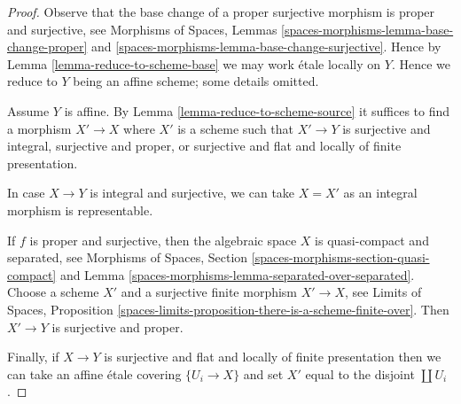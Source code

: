 \documentclass[10pt,a4paper]{amsart}
\theoremstyle{plain}
\theoremstyle{definition}
\theoremstyle{remark}
\numberwithin{equation}{subsection}
\begin{document}
\begin{proof}
Observe that the base change of a proper surjective morphism is
proper and surjective, see
Morphisms of Spaces, Lemmas \ref{spaces-morphisms-lemma-base-change-proper}
and \ref{spaces-morphisms-lemma-base-change-surjective}.
Hence by Lemma \ref{lemma-reduce-to-scheme-base}
we may work \'etale locally on $Y$. Hence
we reduce to $Y$ being an affine scheme; some details omitted.

\medskip\noindent
Assume $Y$ is affine. By Lemma \ref{lemma-reduce-to-scheme-source}
it suffices to find a morphism $X' \to X$ where $X'$ is a scheme such
that $X' \to Y$ is surjective and integral, surjective and proper, or
surjective and flat and locally of finite presentation.

\medskip\noindent
In case $X \to Y$ is integral and surjective, we can take $X = X'$
as an integral morphism is representable.

\medskip\noindent
If $f$ is proper and surjective, then the algebraic space
$X$ is quasi-compact and separated, see
Morphisms of Spaces, Section \ref{spaces-morphisms-section-quasi-compact} and
Lemma \ref{spaces-morphisms-lemma-separated-over-separated}.
Choose a scheme $X'$ and a surjective finite morphism $X' \to X$, see
Limits of Spaces, Proposition
\ref{spaces-limits-proposition-there-is-a-scheme-finite-over}.
Then $X' \to Y$ is surjective and proper.

\medskip\noindent
Finally, if $X \to Y$ is surjective and flat and locally of finite
presentation then we can take an affine \'etale covering $\{U_i \to X\}$
and set $X'$ equal to the disjoint $\coprod U_i$.
\end{proof}
\end{document}
